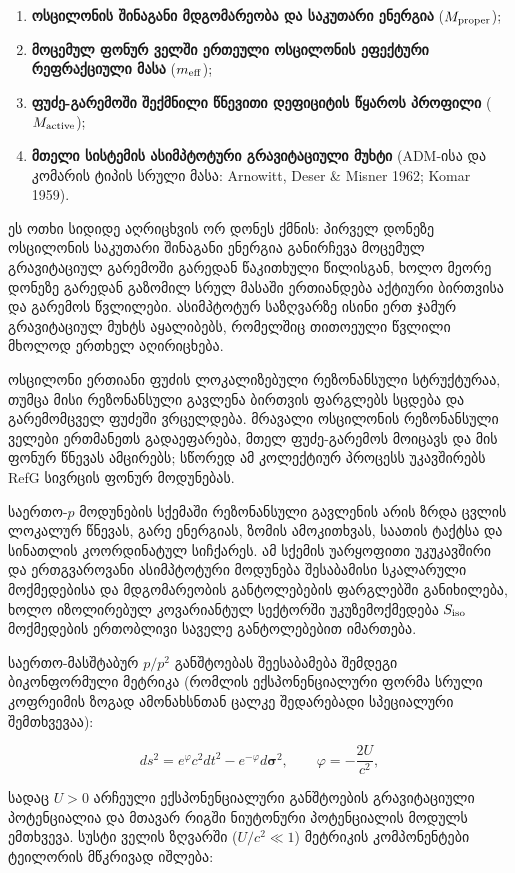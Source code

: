 \documentclass[11pt,a4paper]{article}
\begin{document}
\begin{enumerate}[label=\arabic*.]
\item \textbf{ოსცილონის შინაგანი მდგომარეობა და საკუთარი ენერგია} ($M_{\rm proper}$);
\item \textbf{მოცემულ ფონურ ველში ერთეული ოსცილონის ეფექტური რეფრაქციული მასა} ($m_{\rm eff}$);
\item \textbf{ფუძე-გარემოში შექმნილი წნევითი დეფიციტის წყაროს პროფილი} ($M_{\rm active}$);
\item \textbf{მთელი სისტემის ასიმპტოტური გრავიტაციული მუხტი} (ADM-ისა და კომარის ტიპის სრული მასა: Arnowitt, Deser \& Misner 1962; Komar 1959).

\end{enumerate}
ეს ოთხი სიდიდე აღრიცხვის ორ დონეს ქმნის: პირველ დონეზე ოსცილონის საკუთარი შინაგანი ენერგია განირჩევა მოცემულ გრავიტაციულ გარემოში გარედან წაკითხული წილისგან, ხოლო მეორე დონეზე გარედან გაზომილ სრულ მასაში ერთიანდება აქტიური ბირთვისა და გარემოს წვლილები. ასიმპტოტურ საზღვარზე ისინი ერთ ჯამურ გრავიტაციულ მუხტს აყალიბებს, რომელშიც თითოეული წვლილი მხოლოდ ერთხელ აღირიცხება.

ოსცილონი ერთიანი ფუძის ლოკალიზებული რეზონანსული სტრუქტურაა, თუმცა მისი რეზონანსული გავლენა ბირთვის ფარგლებს სცდება და გარემომცველ ფუძეში ვრცელდება. მრავალი ოსცილონის რეზონანსული ველები ერთმანეთს გადაეფარება, მთელ ფუძე-გარემოს მოიცავს და მის ფონურ წნევას ამცირებს; სწორედ ამ კოლექტიურ პროცესს უკავშირებს RefG სივრცის ფონურ მოდუნებას.

საერთო-$p$ მოდუნების სქემაში რეზონანსული გავლენის არის ზრდა ცვლის ლოკალურ წნევას, გარე ენერგიას, ზომის ამოკითხვას, საათის ტაქტსა და სინათლის კოორდინატულ სიჩქარეს. ამ სქემის უარყოფითი უკუკავშირი და ერთგვაროვანი ასიმპტოტური მოდუნება შესაბამისი სკალარული მოქმედებისა და მდგომარეობის განტოლებების ფარგლებში განიხილება, ხოლო იზოლირებულ კოვარიანტულ სექტორში უკუზემოქმედება $S_{\rm iso}$ მოქმედების ერთობლივი საველე განტოლებებით იმართება.

საერთო-მასშტაბურ $p/p^2$ განშტოებას შეესაბამება შემდეგი ბიკონფორმული მეტრიკა (რომლის ექსპონენციალური ფორმა სრული კოფრეიმის ზოგად ამონახსნთან ცალკე შედარებადი სპეციალური შემთხვევაა):

\[
ds^2 = e^\varphi c^2 dt^2 - e^{-\varphi} d\boldsymbol{\sigma}^2, \qquad \varphi = -\frac{2U}{c^2},
\]

სადაც $U > 0$ არჩეული ექსპონენციალური განშტოების გრავიტაციული პოტენციალია და მთავარ რიგში ნიუტონური პოტენციალის მოდულს ემთხვევა. სუსტი ველის ზღვარში ($U/c^2 \ll 1$) მეტრიკის კომპონენტები ტეილორის მწკრივად იშლება:
\end{document}
